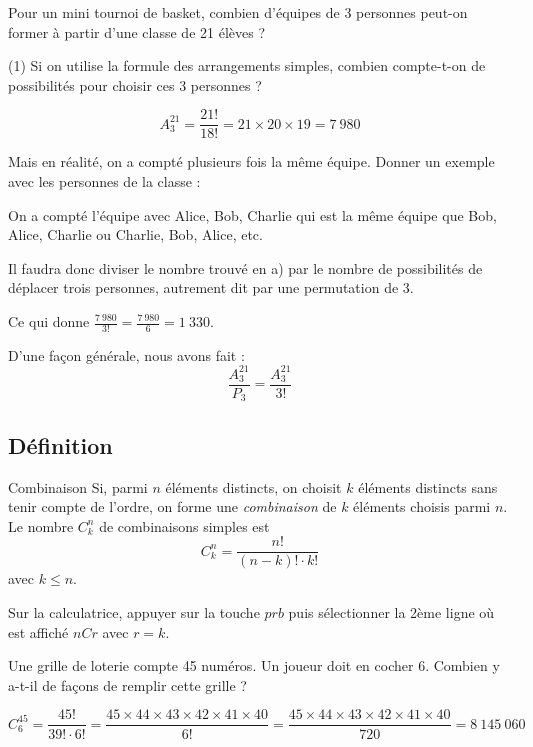 \documentclass[a4paper,12pt]{article}
\begin{document}
\begin{exemple}
	\tcblower
	Pour un mini tournoi de basket, combien d'équipes de 3 personnes peut-on former à partir d'une classe de 21 élèves ?

	\begin{tasks}(1)
		\task Si on utilise la formule des arrangements simples, combien compte-t-on de possibilités pour choisir ces 3 personnes ?
		
		\[A_3^{21} = \frac{21!}{18!} = 21 \times 20 \times 19 = 7~980\]

		\task Mais en réalité, on a compté plusieurs fois la même équipe. Donner un exemple avec les personnes de la classe :
		
		On a compté l'équipe avec Alice, Bob, Charlie qui est la même équipe que Bob, Alice, Charlie ou Charlie, Bob, Alice, etc.

		\task Il faudra donc diviser le nombre trouvé en a) par le nombre de possibilités de déplacer trois personnes, autrement dit par une permutation de 3.
		
		Ce qui donne $\frac{7~980}{3!} = \frac{7~980}{6} = 1~330$.

		\task D'une façon générale, nous avons fait :
		\[\frac{A_3^{21}}{P_3} = \frac{A_3^{21}}{3!}\]
	\end{tasks}
\end{exemple}

\subsection{Définition}

\begin{definition}
	Combinaison
	\tcblower
	Si, parmi $n$ éléments distincts, on choisit $k$ éléments distincts sans tenir compte de l'ordre, on forme une \emph{combinaison} de $k$ éléments choisis parmi $n$. Le nombre $C_k^n$ de combinaisons simples est
	\[C_k^n = \frac{n!}{(n-k)! \cdot k!}\]
	avec $k \leq n$.
\end{definition}

\begin{remarque}
	\tcblower
	Sur la calculatrice, appuyer sur la touche $prb$ puis sélectionner la 2ème ligne où est affiché $nCr$ avec $r = k$.
\end{remarque}

\begin{exemple}
	\tcblower
	Une grille de loterie compte 45 numéros. Un joueur doit en cocher 6. Combien y a-t-il de façons de remplir cette grille ?

	\[C_6^{45} = \frac{45!}{39! \cdot 6!} = \frac{45 \times 44 \times 43 \times 42 \times 41 \times 40}{6!} = \frac{45 \times 44 \times 43 \times 42 \times 41 \times 40}{720} = 8~145~060\]
\end{exemple}
\end{document}

